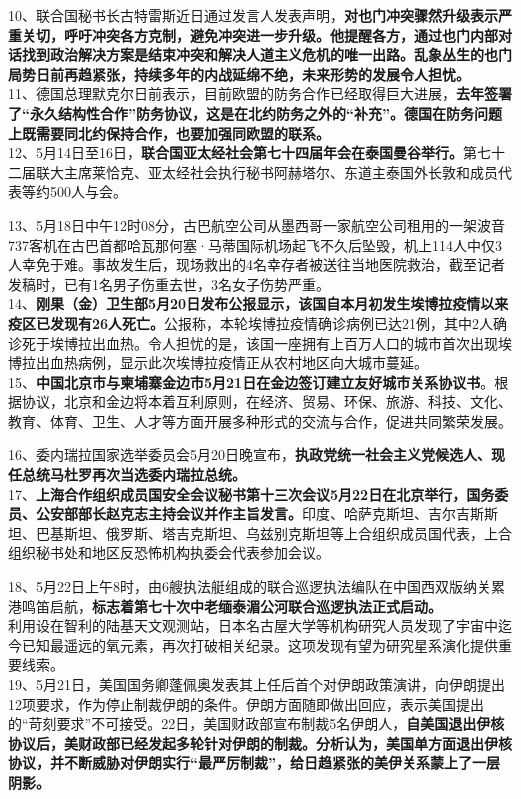 10、联合国秘书长古特雷斯近日通过发言人发表声明，{\textbf{对也门冲突骤然升级表示严重关切，呼吁冲突各方克制，避免冲突进一步升级。他提醒各方，通过也门内部对话找到政治解决方案是结束冲突和解决人道主义危机的唯一出路。乱象丛生的也门局势日前再趋紧张，持续多年的内战延绵不绝，未来形势的发展令人担忧。}}\\
11、德国总理默克尔日前表示，目前欧盟的防务合作已经取得巨大进展，{\textbf{去年签署了``永久结构性合作''防务协议，这是在北约防务之外的``补充''。德国在防务问题上既需要同北约保持合作，也要加强同欧盟的联系。}}\\
12、5月14日至16日，{\textbf{联合国亚太经社会第七十四届年会在泰国曼谷举行。}}第七十二届联大主席莱恰克、亚太经社会执行秘书阿赫塔尔、东道主泰国外长敦和成员代表等约500人与会。

13、5月18日中午12时08分，古巴航空公司从墨西哥一家航空公司租用的一架波音737客机在古巴首都哈瓦那何塞·马蒂国际机场起飞不久后坠毁，机上114人中仅3人幸免于难。事故发生后，现场救出的4名幸存者被送往当地医院救治，截至记者发稿时，已有1名男子伤重去世，3名女子伤势严重。\\
14、{\textbf{刚果（金）卫生部5月20日发布公报显示，该国自本月初发生埃博拉疫情以来疫区已发现有26人死亡。}}公报称，本轮埃博拉疫情确诊病例已达21例，其中2人确诊死于埃博拉出血热。令人担忧的是，该国一座拥有上百万人口的城市首次出现埃博拉出血热病例，显示此次埃博拉疫情正从农村地区向大城市蔓延。\\
15、{\textbf{中国北京市与柬埔寨金边市5月21日在金边签订建立友好城市关系协议书}}。根据协议，北京和金边将本着互利原则，在经济、贸易、环保、旅游、科技、文化、教育、体育、卫生、人才等方面开展多种形式的交流与合作，促进共同繁荣发展。

16、委内瑞拉国家选举委员会5月20日晚宣布，{\textbf{执政党统一社会主义党候选人、现任总统马杜罗再次当选委内瑞拉总统。}}\\
17、{\textbf{上海合作组织成员国安全会议秘书第十三次会议5月22日在北京举行，国务委员、公安部部长赵克志主持会议并作主旨发言。}}印度、哈萨克斯坦、吉尔吉斯斯坦、巴基斯坦、俄罗斯、塔吉克斯坦、乌兹别克斯坦等上合组织成员国代表，上合组织秘书处和地区反恐怖机构执委会代表参加会议。

18、5月22日上午8时，由6艘执法艇组成的联合巡逻执法编队在中国西双版纳关累港鸣笛启航，{\textbf{标志着第七十次中老缅泰湄公河联合巡逻执法正式启动。}}\\
利用设在智利的陆基天文观测站，日本名古屋大学等机构研究人员发现了宇宙中迄今已知最遥远的氧元素，再次打破相关纪录。这项发现有望为研究星系演化提供重要线索。\\
19、5月21日，美国国务卿蓬佩奥发表其上任后首个对伊朗政策演讲，向伊朗提出12项要求，作为停止制裁伊朗的条件。伊朗方面随即做出回应，表示美国提出的``苛刻要求''不可接受。22日，美国财政部宣布制裁5名伊朗人，{\textbf{自美国退出伊核协议后，美财政部已经发起多轮针对伊朗的制裁。分析认为，美国单方面退出伊核协议，并不断威胁对伊朗实行``最严厉制裁''，给日趋紧张的美伊关系蒙上了一层阴影。}}

